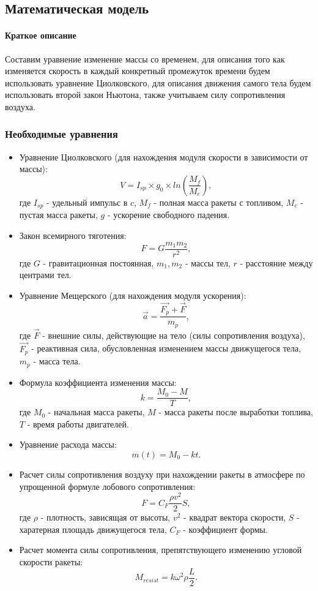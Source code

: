 \subsection{Математическая модель}
\paragraph{Краткое описание} Составим уравнение изменение массы со временем, для описания того как изменяется скорость в каждый конкретный промежуток времени будем использовать уравнение Циолковского, для описания движения самого тела будем использовать второй закон Ньютона, также учитываем силу сопротивления воздуха.

\subsubsection{Необходимые уравнения}
\begin{itemize}
	\item Уравнение Циолковского (для нахождения модуля скорости в зависимости от массы): \[V = I_{sp} \times g_0 \times ln(\frac{M_f}{M_e}),\] где $I_{sp}$ - удельный импульс в $c$,  $M_f$ - полная масса ракеты с топливом, $M_e$ - пустая масса ракеты, $g$ - ускорение свободного падения.
	\item Закон всемирного тяготения: \[F = G\frac{m_1 m_2}{r^2},\] где $G$ - гравитационная постоянная, $m_1, m_2$ - массы тел, $r$ - расстояние между центрами тел.
	\item Уравнение Мещерского (для нахождения модуля ускорения): \[\vec{a} = \frac{\vec{F_p} + \vec{F}}{m_p},\] где $\vec{F}$ - внешние силы, действующие на тело (силы сопротивления воздуха), $\vec{F_p}$ - реактивная сила, обусловленная изменением массы движущегося тела, $m_p$ - масса тела.
	\item Формула коэффициента изменения массы: \[k = \frac{M_0 - M}{T},\] где $M_0$ - начальная масса ракеты, $M$ - масса ракеты после выработки топлива, $T$ - время работы двигателей.
	\item Уравнение расхода массы: \[m(t) = M_0 - kt.\]
	\item Расчет силы сопротивления воздуху при нахождении ракеты в атмосфере по упрощенной формуле лобового сопротивления: \[F = C_F \frac{\rho v^2}{2}S,\] где $\rho$ - плотность, зависящая от высоты, $v^2$ - квадрат вектора скорости, $S$ - харатерная площадь движущегося тела, $C_F$ - коэффициент формы.
	\item Расчет момента силы сопротивления, препятствующего изменению угловой скорости ракеты: \[M_{resist} = k \omega^2 \rho \frac{L}{2}.\]
\end{itemize}


